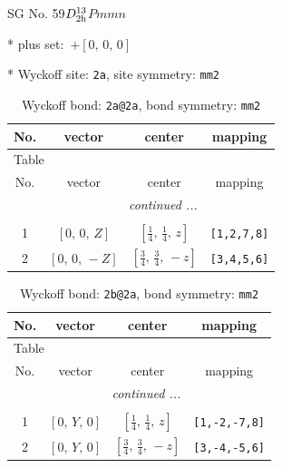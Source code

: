 \documentclass[fleqn,8pt]{jsarticle}
\begin{document}
\setcounter{MaxMatrixCols}{32}

\renewcommand{\tablename}{Table~}
\renewcommand{\figurename}{Figure~}
\begin{center}
\LARGE
SG No. 59\quad$D_{\rm 2h}^{13}$\quad$Pmmn$\quad[ orthorhombic ]
\end{center}

* plus set:\,\,\,$+\left[ 0,\, 0,\, 0 \right]$


* Wyckoff site: {\tt 2a}, site symmetry: {\tt mm2}
\renewcommand{\arraystretch}{1.2}
\begin{longtable}{cccc}
\caption{Wyckoff bond: {\tt 2a@2a}, bond symmetry: {\tt mm2}}
 \\
 \hline \hline
No. & vector & center & mapping \\ \hline \endfirsthead

\multicolumn{3}{l}{\tablename\ \thetable{}} \\
 \hline \hline
No. & vector & center & mapping \\ \hline \endhead

 \hline \hline
\multicolumn{3}{r}{\footnotesize\it continued ...} \\ \endfoot

 \hline \hline
\multicolumn{3}{r}{} \\ \endlastfoot

1 & $\left[ 0,\, 0,\, Z \right]$ & $\left[ \frac{1}{4},\, \frac{1}{4},\, z \right]$ & {\tt [1,2,7,8]} \\ \hline
2 & $\left[ 0,\, 0,\, - Z \right]$ & $\left[ \frac{3}{4},\, \frac{3}{4},\, - z \right]$ & {\tt [3,4,5,6]} \\
\end{longtable}
\renewcommand{\arraystretch}{1.2}
\begin{longtable}{cccc}
\caption{Wyckoff bond: {\tt 2b@2a}, bond symmetry: {\tt mm2}}
 \\
 \hline \hline
No. & vector & center & mapping \\ \hline \endfirsthead

\multicolumn{3}{l}{\tablename\ \thetable{}} \\
 \hline \hline
No. & vector & center & mapping \\ \hline \endhead

 \hline \hline
\multicolumn{3}{r}{\footnotesize\it continued ...} \\ \endfoot

 \hline \hline
\multicolumn{3}{r}{} \\ \endlastfoot

1 & $\left[ 0,\, Y,\, 0 \right]$ & $\left[ \frac{1}{4},\, \frac{1}{4},\, z \right]$ & {\tt [1,-2,-7,8]} \\ \hline
2 & $\left[ 0,\, Y,\, 0 \right]$ & $\left[ \frac{3}{4},\, \frac{3}{4},\, - z \right]$ & {\tt [3,-4,-5,6]} \\
\end{longtable}
\end{document}

